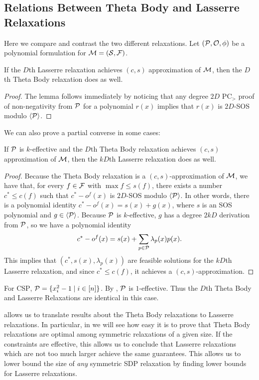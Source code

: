 \subsection{Relations Between Theta Body and Lasserre Relaxations}
Here we compare and contrast the two different relaxations. Let $(\mathcal P, \mathcal O, \phi)$ be a polynomial formulation for $\mathcal M = (\mathcal S, \mathcal F)$.
\begin{lemma}
If the $D$th Lasserre relaxation achieves $(c,s)$ approximation of $\mathcal M$, then the $D$th Theta Body relaxation does as well.
\end{lemma}
\begin{proof}
The lemma follows immediately by noticing that any degree $2D$ PC$_>$ proof of non-negativity from $\mathcal P$ for a polynomial $r(x)$ implies that $r(x)$ is $2D$-SOS modulo $\langle \mathcal P \rangle$.
\end{proof}
We can also prove a partial converse in some cases:
\begin{proposition}\label{prop:tb_to_sos}
If $\mathcal P$ is $k$-effective and the $D$th Theta Body relaxation achieves $(c,s)$ approximation of $\mathcal M$, then the $kD$th Lasserre relaxation does as well.
\end{proposition}
\begin{proof}
Because the Theta Body relaxation is a $(c,s)$-approximation of $\mathcal M$, we have that, for every $f \in \mathcal F$ with $\max f \leq s(f)$, there exists a number $c^* \leq c(f)$ such that $c^* - o^f(x)$ is $2D$-SOS modulo $\langle \mathcal P \rangle$. In other words, there is a polynomial identity $c^* - o^f(x) = s(x) + g(x)$, where $s$ is an SOS polynomial and $g \in \langle \mathcal P \rangle$. Because $\mathcal P$ is $k$-effective, $g$ has a degree $2kD$ derivation from $\mathcal P$, so we have a polynomial identity
\[c^* - o^f(x) = s(x) + \sum_{p \in \mathcal P} \lambda_p(x)p(x).\]
This implies that $(c^*, s(x), \lambda_p(x))$ are feasible solutions for the $kD$th Lasserre relaxation, and since $c^* \leq c(f)$, it achieves a $(c,s)$-approximation.
\end{proof}
\begin{example}
For \textsc{CSP}, $\mathcal P = \{x_i^2 - 1 \mid i \in [n]\}$. By , $\mathcal P$ is $1$-effective. Thus the $D$th Theta Body and Lasserre Relaxations are identical in this case.
\end{example}
 allows us to translate results about the Theta Body relaxations to Lasserre relaxations. In particular, in  we will see how easy it is to prove that Theta Body relaxations are optimal among symmetric relaxations of a given size. If the constraints are effective, this allows us to conclude that Lasserre relaxations which are not too much larger achieve the same guarantees. This allows us to lower bound the size of \emph{any} symmetric SDP relaxation by finding lower bounds for Lasserre relaxations.

